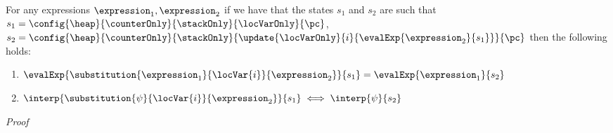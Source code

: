 \begin{substLv}\label{substLv}
For any expressions $ \expression_1, \expression_2 $ 
if we have that the states $s_1$ and $s_2$ are such that
$ s_1 =   \config{\heap}{\counterOnly}{ \stackOnly }{\locVarOnly}{\pc }$, %
$ s_2 =   \config{\heap}{\counterOnly }{ \stackOnly }{\update{\locVarOnly}{i}{ \evalExp{ \expression_2}{ s_1 } }}{\pc }  $
 then 
the following holds:
\begin{enumerate}
      \item $\evalExp{\substitution{\expression_1}{ \locVar{i} }{ \expression_2 }}{ s_1 } = \evalExp{\expression_1}{s_2} $
      \item $\interp{\substitution{\psi}{ \locVar{i} }{ \expression_2 }}{ s_1 } \iff \interp{\psi}{s_2} $
\end{enumerate}
\end{substLv}
\textit{Proof} 
